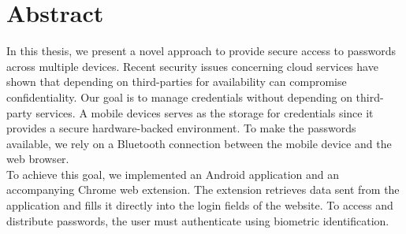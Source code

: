 
\section*{Abstract} \label{cha:abstract}
In this thesis, we present a novel approach to provide secure access to passwords across multiple devices. Recent security issues concerning cloud services have shown that depending on third-parties for availability can compromise confidentiality. Our goal is to manage credentials without depending on third-party services. A mobile devices serves as the storage for credentials since it provides a secure hardware-backed environment. To make the passwords available, we rely on a Bluetooth connection between the mobile device and the web browser. \\
To achieve this goal, we implemented an Android application and an accompanying Chrome web extension. The extension retrieves data sent from the application and fills it directly into the login fields of the website. To access and distribute passwords, the user must authenticate using biometric identification.


